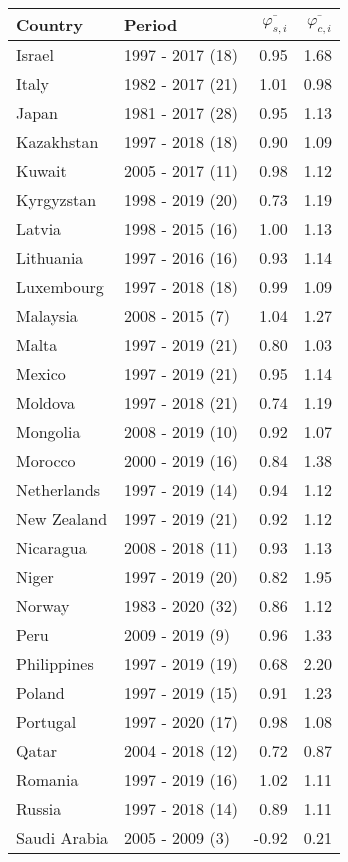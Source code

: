 \begin{table}[H]
{{\centering
\begin{tabular}{llrr}
\toprule
Country & Period & $\overline{\varphi_{s,i}}$ & $\overline{\varphi_{c,i}}$\\
\midrule
Israel & 1997 - 2017 (18) & 0.95 & 1.68\\
Italy & 1982 - 2017 (21) & 1.01 & 0.98\\
Japan & 1981 - 2017 (28) & 0.95 & 1.13\\
Kazakhstan & 1997 - 2018 (18) & 0.90 & 1.09\\
Kuwait & 2005 - 2017 (11) & 0.98 & 1.12\\
\addlinespace
Kyrgyzstan & 1998 - 2019 (20) & 0.73 & 1.19\\
Latvia & 1998 - 2015 (16) & 1.00 & 1.13\\
Lithuania & 1997 - 2016 (16) & 0.93 & 1.14\\
Luxembourg & 1997 - 2018 (18) & 0.99 & 1.09\\
Malaysia & 2008 - 2015 (7) & 1.04 & 1.27\\
\addlinespace
Malta & 1997 - 2019 (21) & 0.80 & 1.03\\
Mexico & 1997 - 2019 (21) & 0.95 & 1.14\\
Moldova & 1997 - 2018 (21) & 0.74 & 1.19\\
Mongolia & 2008 - 2019 (10) & 0.92 & 1.07\\
Morocco & 2000 - 2019 (16) & 0.84 & 1.38\\
\addlinespace
Netherlands & 1997 - 2019 (14) & 0.94 & 1.12\\
New Zealand & 1997 - 2019 (21) & 0.92 & 1.12\\
Nicaragua & 2008 - 2018 (11) & 0.93 & 1.13\\
Niger & 1997 - 2019 (20) & 0.82 & 1.95\\
Norway & 1983 - 2020 (32) & 0.86 & 1.12\\
\addlinespace
Peru & 2009 - 2019 (9) & 0.96 & 1.33\\
Philippines & 1997 - 2019 (19) & 0.68 & 2.20\\
Poland & 1997 - 2019 (15) & 0.91 & 1.23\\
Portugal & 1997 - 2020 (17) & 0.98 & 1.08\\
Qatar & 2004 - 2018 (12) & 0.72 & 0.87\\
\addlinespace
Romania & 1997 - 2019 (16) & 1.02 & 1.11\\
Russia & 1997 - 2018 (14) & 0.89 & 1.11\\
Saudi Arabia & 2005 - 2009 (3) & -0.92 & 0.21\\

\end{tabular}}}
\end{table}
